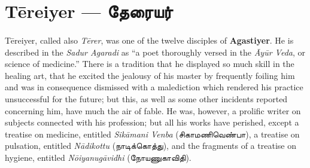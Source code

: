 \documentclass{article}
\newcommand{\TamilText}[1]{\texttamil{#1}}
\newcommand{\TamilBold}[1]{\texttamil{\textbf{#1}}}
\newcommand{\tam}[1]{\TamilText{#1}}
\newcommand{\tambold}[1]{\TamilBold{#1}}
\begin{document}
\section{T\={e}reiyer --- \tambold{தேரையர்}}
\paragraph{}
T\={e}reiyer, called also \emph{T\={e}rer}, was one of the twelve disciples of \textbf{Agastiyer}. He is described in the \emph{Sadur Agaradi} as ``a poet thoroughly versed in the \emph{\={A}y\={u}r Veda}, or science of medicine.'' There is a tradition that he displayed so much skill in the healing art, that he excited the jealousy of his master by frequently foiling him and was in consequence dismissed with a malediction which rendered his practice unsuccessful for the future; but this, as well as some other incidents reported concerning him, have much the air of fable. He was, however, a prolific writer on subjects connected with his profession; but all his works have perished, except a treatise on medicine, entitled \emph{Sik\={a}mani Venba} (\tam{சிகாமணிவெண்பா}), a treatise on pulsation, entitled \emph{N\={a}dikottu} (\tam{நாடிக்கொத்து}), and the fragments of a treatise on hygiene, entitled \emph{N\={o}iyanug\={a}vidhi} (\tam{நோயணுகாவிதி}).
\end{document}
